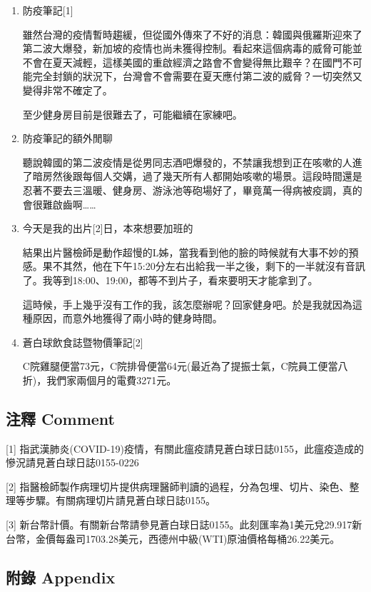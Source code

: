 \documentclass[a5paper, 11pt
]{book}
\begin{document}
\begin{enumerate}
\def\labelenumi{\arabic{enumi}.}
\item
  防疫筆記{[}1{]}

  雖然台灣的疫情暫時趨緩，但從國外傳來了不好的消息：韓國與俄羅斯迎來了第二波大爆發，新加坡的疫情也尚未獲得控制。看起來這個病毒的威脅可能並不會在夏天減輕，這樣美國的重啟經濟之路會不會變得無比艱辛？在國門不可能完全封鎖的狀況下，台灣會不會需要在夏天應付第二波的威脅？一切突然又變得非常不確定了。

  至少健身房目前是很難去了，可能繼續在家練吧。
\item
  防疫筆記的額外閒聊

  聽說韓國的第二波疫情是從男同志酒吧爆發的，不禁讓我想到正在咳嗽的人進了暗房然後跟每個人交媾，過了幾天所有人都開始咳嗽的場景。這段時間還是忍著不要去三溫暖、健身房、游泳池等砲場好了，畢竟萬一得病被疫調，真的會很難啟齒啊\ldots\ldots{}
\item
  今天是我的出片{[}2{]}日，本來想要加班的

  結果出片醫檢師是動作超慢的L姊，當我看到他的臉的時候就有大事不妙的預感。果不其然，他在下午15:20分左右出給我一半之後，剩下的一半就沒有音訊了。我等到18:00、19:00，都等不到片子，看來要明天才能拿到了。

  這時候，手上幾乎沒有工作的我，該怎麼辦呢？回家健身吧。於是我就因為這種原因，而意外地獲得了兩小時的健身時間。
\item
  蒼白球飲食誌暨物價筆記{[}2{]}

  C院雞腿便當73元，C院排骨便當64元(最近為了提振士氣，C院員工便當八折)，我們家兩個月的電費3271元。
\end{enumerate}

\hypertarget{ux6ce8ux91cb-comment-71}{%
\subsection{注釋 Comment}\label{ux6ce8ux91cb-comment-71}}

{[}1{]}
指武漢肺炎(COVID-19)疫情，有關此瘟疫請見蒼白球日誌0155，此瘟疫造成的慘況請見蒼白球日誌0155-0226

{[}2{]}
指醫檢師製作病理切片提供病理醫師判讀的過程，分為包埋、切片、染色、整理等步驟。有關病理切片請見蒼白球日誌0155。

{[}3{]}
新台幣計價。有關新台幣請參見蒼白球日誌0155。此刻匯率為1美元兌29.917新台幣，金價每盎司1703.28美元，西德州中級(WTI)原油價格每桶26.22美元。

\hypertarget{ux9644ux9304-appendix-71}{%
\subsection{附錄 Appendix}\label{ux9644ux9304-appendix-71}}
\end{document}
